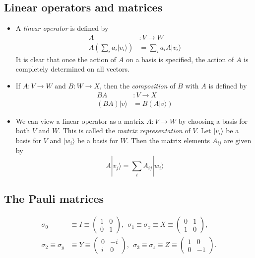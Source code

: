 \documentclass[12 pt]{article}
\begin{document}
\subsection{Linear operators and matrices}
\begin{itemize}
	\item A \emph{linear operator} is defined by
	\begin{align*}
		A&:V \to W \\
		A(\sum_i a_i|v_i\rangle)&=\sum_ia_i A|v_i\rangle
	\end{align*}
	It is clear that once the action of $A$ on a basis is specified, the action of $A$ is completely determined on all vectors.
	\item If $A:V \to W$ and $B:W \to X$, then the \emph{composition} of $B$ with $A$ is defined by
	\begin{align*}
		BA&:V \to X \\
		(BA)|v\rangle &=B(A|v\rangle)
	\end{align*}
	\item We can view a linear operator as a matrix $A:V \to W$ by choosing a basis for both $V$ and $W$. This is called the \emph{matrix representation} of $V$. Let $|v_i\rangle$ be a basis for $V$ and $|w_i\rangle$ be a basis for $W$. Then the matrix elements $A_{ij}$ are given by
	$$A|v_j\rangle = \sum_i A_{ij}|w_i\rangle$$
\end{itemize}
\subsection{The Pauli matrices}
\begin{align*}
	\sigma_0&\equiv I \equiv \begin{pmatrix}
		1&0\\0&1
	\end{pmatrix}, \ \  \sigma_1\equiv \sigma_x \equiv X \equiv \begin{pmatrix}
		0&1\\1&0
	\end{pmatrix}, \\
	\sigma_2 \equiv \sigma_y &\equiv Y\equiv \begin{pmatrix}
		0&-i\\i&0
	\end{pmatrix}, \ \ \sigma_3 \equiv \sigma_z\equiv Z \equiv \begin{pmatrix}
		1&0\\0&-1
	\end{pmatrix}.
\end{align*}
\end{document}
